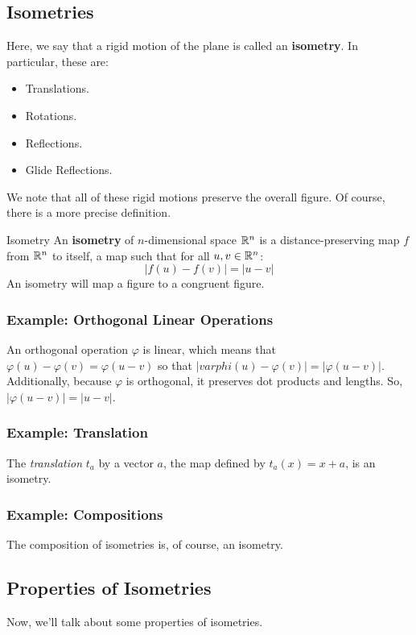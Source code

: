\documentclass[letterpaper]{article}
\begin{document}
\subsection{Isometries}
Here, we say that a rigid motion of the plane is called an \textbf{isometry}. In particular, these are: 
\begin{itemize}
    \item Translations. 
    \item Rotations. 
    \item Reflections.
    \item Glide Reflections. 
\end{itemize}

We note that all of these rigid motions preserve the overall figure. Of course, there is a more precise definition. 
\begin{definition}{Isometry}{}
    An \textbf{isometry} of $n$-dimensional space $\mathbb{R}^n$ is a distance-preserving map $f$ from $\mathbb{R}^n$ to itself, a map such that for all $u, v \in \mathbb{R}^n$: 
    \[|f(u) - f(v)| = |u - v|\]
    An isometry will map a figure to a congruent figure. 
\end{definition}

\subsubsection{Example: Orthogonal Linear Operations}
An orthogonal operation $\varphi$ is linear, which means that $\varphi(u) - \varphi(v) = \varphi(u - v)$ so that $|varphi(u) - \varphi(v)| = |\varphi(u - v)|$. Additionally, because $\varphi$ is orthogonal, it preserves dot products and lengths. So, $|\varphi(u - v)| = |u - v|$. 

\subsubsection{Example: Translation}
The \emph{translation} $t_a$ by a vector $a$, the map defined by $t_{a}(x) = x + a$, is an isometry.

\subsubsection{Example: Compositions}
The composition of isometries is, of course, an isometry. 

\subsection{Properties of Isometries}
Now, we'll talk about some properties of isometries.
\end{document}
